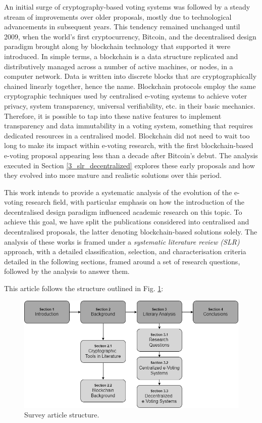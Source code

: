 \documentclass{ieeeaccess}
\begin{document}
    An initial surge of cryptography-based voting systems was followed by a steady stream of improvements over older proposals, mostly due to technological advancements in subsequent years. This tendency remained unchanged until 2009, when the world's first cryptocurrency, Bitcoin, and the decentralised design paradigm brought along by blockchain technology \cite{Nakamoto2008} that supported it were introduced. In simple terms, a blockchain is a data structure replicated and distributively managed across a number of active machines, or nodes, in a computer network. Data is written into discrete blocks that are cryptographically chained linearly together, hence the name. Blockchain protocols employ the same cryptographic techniques used by centralised e-voting systems to achieve voter privacy, system transparency, universal verifiability, etc. in their basic mechanics. Therefore, it is possible to tap into these native features to implement transparency and data immutability in a voting system, something that requires dedicated resources in a centralised model. Blockchain did not need to wait too long to make its impact within e-voting research, with the first blockchain-based e-voting proposal appearing less than a decade after Bitcoin's debut. The analysis executed in Section \ref{3_slr_decentralized} explores these early proposals and how they evolved into more mature and realistic solutions over this period.
    \par
    This work intends to provide a systematic analysis of the evolution of the e-voting research field, with particular emphasis on how the introduction of the decentralised design paradigm influenced academic research on this topic. To achieve this goal, we have split the publications considered into centralised and decentralised proposals, the latter denoting blockchain-based solutions solely. The analysis of these works is framed under a \textit{systematic literature review (SLR)} \cite{Kitechenham2009} \cite{Petersen2008} \cite{Tranfield2003} approach, with a detailed classification, selection, and characterisation criteria detailed in the following sections, framed around a set of research questions, followed by the analysis to answer them.
    \par
    This article follows the structure outlined in Fig. \ref{fig:paper_structure}:


    \begin{figure}[h!]
        \centering
        \includegraphics[width=\columnwidth]{Images/almei1.png}
        \caption{Survey article structure.}
        \label{fig:paper_structure}
    \end{figure}
\end{document}
